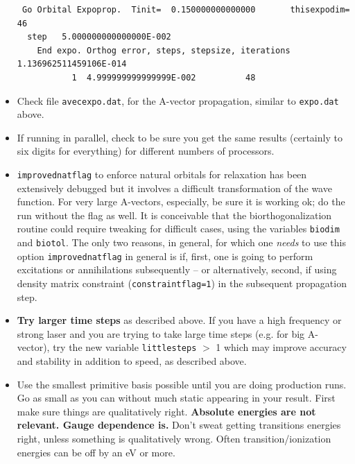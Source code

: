\documentclass[10pt,leqno, oneside]{book}
\begin{document}
\begin{itemize}
{{\begin{verbatim}
 Go Orbital Expoprop.  Tinit=  0.150000000000000       thisexpodim=          46 
  step   5.000000000000000E-002
    End expo. Orthog error, steps, stepsize, iterations  1.136962511459106E-014
           1  4.999999999999999E-002          48
\end{verbatim}}
}
\item{Check file \verb#avecexpo.dat#, for the A-vector propagation, similar to \verb#expo.dat# above.}
%
\item{If running in parallel, check to be sure you get the same results (certainly to six digits for everything) for different numbers of processors.}
\item{ \verb#improvednatflag# to enforce natural orbitals for relaxation has been extensively debugged but it involves a difficult transformation of
the wave function.  For very large A-vectors, especially, be sure it is working ok; do the run without the flag as well. 
It is conceivable that the biorthogonalization routine could require tweaking for difficult cases, using the variables \verb#biodim# and \verb#biotol#.
The only two reasons, in general, for which  one \textit{needs} to use this option \verb#improvednatflag# in general is if, first,
one is going to perform excitations or annihilations subsequently -- or alternatively, second, if using density
matrix constraint (\verb#constraintflag=1#) in the subsequent propagation step.}
\item{\textbf{Try larger time steps} as described above. If you have a high frequency or strong laser and you are trying to take large time steps (e.g. for big A-vector), 
try the new variable \verb#littlesteps# $>$ 1 which may improve accuracy and stability in addition to speed, as described above.}
\item{Use the smallest primitive basis possible until you are doing production runs.  Go as small as you can without much static appearing in your result.  First 
make sure things are qualitatively right. \textbf{Absolute energies are not relevant.  Gauge dependence is.} Don't sweat getting transitions energies right, unless something is qualitatively
wrong.  Often transition/ionization energies can be off by an eV or more.}
%
\end{itemize}
\end{document}
